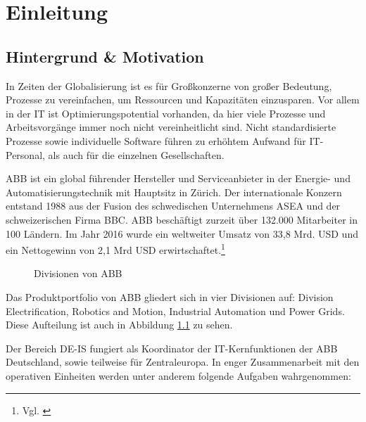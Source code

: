 \chapter{Einleitung}

\section{Hintergrund \& Motivation}

In Zeiten der Globalisierung ist es für Großkonzerne von großer Bedeutung, Prozesse zu vereinfachen, um Ressourcen und Kapazitäten einzusparen. Vor allem in der \ac{IT} ist Optimierungspotential vorhanden, da hier viele Prozesse und Arbeitsvorgänge immer noch nicht vereinheitlicht sind.
Nicht standardisierte Prozesse sowie individuelle Software führen zu erhöhtem Aufwand für IT-Personal, als auch für die einzelnen Gesellschaften.

\ac{ABB} ist ein global f\"{u}hrender Hersteller und Serviceanbieter in der Energie- und Automatisierungstechnik mit Hauptsitz in Z\"{u}rich.
Der internationale Konzern entstand 1988 aus der Fusion des schwedischen Unternehmens \ac{ASEA} und der schweizerischen Firma \ac{BBC}. ABB besch\"{a}ftigt zurzeit \"{u}ber 132.000 Mitarbeiter in 100 L\"{a}ndern. Im Jahr 2016 wurde ein weltweiter Umsatz von 33,8 Mrd. USD und ein Nettogewinn von 2,1 Mrd USD erwirtschaftet.\footnote{Vgl. \cite{ABB.2017}} 




\begin{figure}[ht]
	\centering
	
	\caption{Divisionen von \acs{ABB}}
	\label{fig1}
	
\end{figure}

Das Produktportfolio von \ac{ABB} gliedert sich in vier Divisionen auf: Division Electrification, Robotics and Motion, Industrial Automation und Power Grids. Diese Aufteilung ist auch in Abbildung \ref{fig1} zu sehen.

Der Bereich \ac{DE-IS} fungiert als Koordinator der IT-Kernfunktionen der \ac{ABB} Deutschland, sowie teilweise für Zentraleuropa. In enger Zusammenarbeit mit den operativen Einheiten werden unter anderem folgende Aufgaben wahrgenommen:

